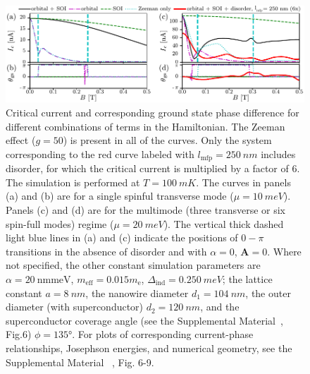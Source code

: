 \begin{figure}[t]
\includegraphics[width=\textwidth]{chapter_supercurrent/figures/fig4.pdf}
\caption{Critical current and corresponding ground state phase difference for different combinations of terms in the Hamiltonian.
The Zeeman effect ($g=50$) is present in all of the curves.
Only the system corresponding to the red curve labeled with $l_\textrm{mfp}=\SI{250}{nm}$ includes disorder, for which the critical current is multiplied by a factor of 6. The simulation is performed at $T=\SI{100}{mK}$.
The curves in panels (a) and (b) are for a single spinful transverse mode ($\mu=\SI{10}{meV}$).
Panels (c) and (d) are for the multimode (three transverse or six spin-full modes) regime ($\mu=\SI{20}{meV}$).
The vertical thick dashed light blue lines in (a) and (c) indicate the positions of $0-\pi$ transitions in the absence of disorder and with $\alpha = 0$, $\mathbf{A}=0$.
Where not specified, the other constant simulation parameters are $\alpha=\SI{20}{\nm \meV}$, $m_\textrm{eff}=0.015 m_\textrm{e}$, $\Delta_\textrm{ind}=\SI{0.250}{meV}$; the lattice constant $a=\SI{8}{nm}$, the nanowire diameter $d_1=\SI{104}{nm}$, the outer diameter (with superconductor) $d_2=\SI{120}{nm}$, and the superconductor coverage angle (see the Supplemental Material~\cite{supp}, Fig.6) $\phi=135\si{\degree}$. For plots of corresponding current-phase relationships, Josephson energies, and numerical geometry, see the Supplemental Material ~\cite{supp}, Fig. 6-9.
}
\label{fig:critical_currents}
\end{figure}

